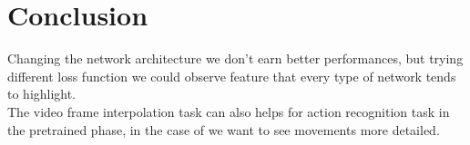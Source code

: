\documentclass[11pt, a4paper]{article}
\begin{document}
	\section{Conclusion}
	Changing the network architecture we don't earn better performances, but trying different loss function we could observe feature that every type of network tends to highlight.\\ 
	The video frame interpolation task can also helps for action recognition task in the pretrained phase, in the case of we want to see movements more detailed.
	
	
	
	
\end{document}
